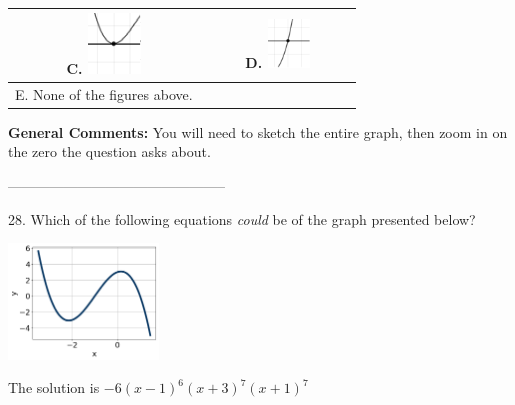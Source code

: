 \documentclass{article}[14pt]
\begin{document}
\begin{tabular}{|c|c|}
 \textbf{C.} \includegraphics[width=0.3\textwidth]{../Figures/zeroBehaviorPositiveEvenB.png} & \textbf{D.} \includegraphics[width=0.3\textwidth]{../Figures/zeroBehaviorPositiveOddB.png} \tabularnewline 
\hline 
 E. None of the figures above. & \tabularnewline 
\hline 
 \end{tabular} 
 
\textbf{General Comments:} You will need to sketch the entire graph, then zoom in on the zero the question asks about.

-----------------------------------------------

28. Which of the following equations \textit{could} be of the graph presented below?
\begin{center} \includegraphics[width=0.3\textwidth]{../Figures/polyGraphToFunctionB.png} \end{center} 

The solution is $ -6(x - 1)^{6} (x + 3)^{7} (x + 1)^{7} $ 
\end{document}
